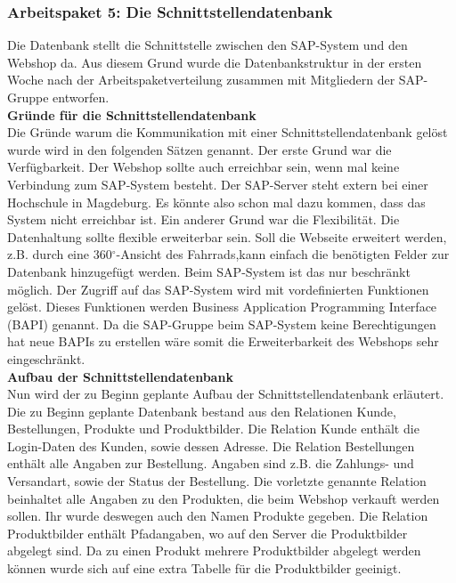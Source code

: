 \subsubsection{Arbeitspaket 5: Die Schnittstellendatenbank}
Die Datenbank stellt die Schnittstelle zwischen den SAP-System und den Webshop da. Aus diesem Grund wurde die Datenbankstruktur in der ersten Woche nach der Arbeitspaketverteilung zusammen mit Mitgliedern der SAP-Gruppe entworfen.\\

\textbf{Gründe für die Schnittstellendatenbank}\\
Die Gründe warum die Kommunikation mit einer Schnittstellendatenbank gelöst wurde wird in den folgenden Sätzen genannt. Der erste Grund war die Verfügbarkeit. Der Webshop sollte auch erreichbar sein, wenn mal keine Verbindung zum SAP-System besteht. Der SAP-Server steht extern bei einer Hochschule in Magdeburg. Es könnte also schon mal dazu kommen, dass das System nicht erreichbar ist. Ein anderer Grund war die Flexibilität. Die Datenhaltung sollte flexible erweiterbar sein. Soll die Webseite erweitert werden, z.B. durch eine 360$^\circ$-Ansicht des Fahrrads,kann einfach die benötigten Felder zur Datenbank hinzugefügt werden. Beim SAP-System ist das nur beschränkt möglich. Der Zugriff auf das SAP-System wird mit vordefinierten Funktionen gelöst. Dieses Funktionen werden \glqq Business Application Programming Interface (BAPI)\grqq{} genannt. Da die SAP-Gruppe beim SAP-System keine Berechtigungen hat neue BAPIs zu erstellen wäre somit die Erweiterbarkeit des Webshops sehr eingeschränkt.\\

\textbf{Aufbau der Schnittstellendatenbank}\\
Nun wird der zu Beginn geplante Aufbau der Schnittstellendatenbank erläutert. Die zu Beginn geplante Datenbank bestand aus den Relationen \glqq Kunde\grqq{}, \glqq Bestellungen\grqq{}, \glqq Produkte\grqq{} und \glqq Produktbilder\grqq{}. Die Relation \glqq Kunde\grqq{} enthält die Login-Daten des Kunden, sowie dessen Adresse. Die Relation \glqq Bestellungen\grqq{} enthält alle Angaben zur Bestellung. Angaben sind z.B. die Zahlungs- und Versandart, sowie der Status der Bestellung. Die vorletzte genannte Relation beinhaltet alle Angaben zu den Produkten, die beim Webshop verkauft werden sollen. Ihr wurde deswegen auch den Namen \glqq Produkte\grqq{} gegeben. Die Relation \glqq Produktbilder\grqq{} enthält Pfadangaben, wo auf den Server die Produktbilder abgelegt sind. Da zu einen Produkt mehrere Produktbilder abgelegt werden können wurde sich auf eine extra Tabelle für die Produktbilder geeinigt.

